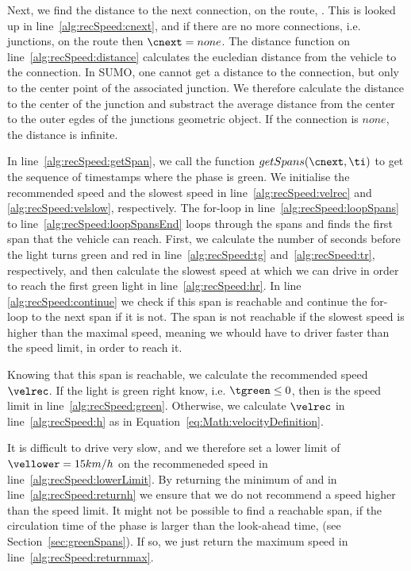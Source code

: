 Next, we find the distance to the next connection, \cnext on the route, \route. 
This is looked up in line~\ref{alg:recSpeed:cnext}, and if there are no more connections, i.e. junctions, on the route then $\cnext=none$.
The distance function on line~\ref{alg:recSpeed:distance} calculates the eucledian distance from the vehicle to the connection.
In SUMO, one cannot get a distance to the connection, but only to the center point of the associated junction.
We therefore calculate the distance to the center of the junction and substract the average distance from the center to the outer egdes of the junctions geometric object. %
If the connection is $none$, the distance is infinite.

In line~\ref{alg:recSpeed:getSpan}, we call the function $getSpans(\cnext, \ti)$ to get the sequence of timestamps where the phase is green.
We initialise the recommended speed and the slowest speed in line~\ref{alg:recSpeed:velrec} and \ref{alg:recSpeed:velslow}, respectively.
The for-loop in line~\ref{alg:recSpeed:loopSpans} to line~\ref{alg:recSpeed:loopSpansEnd} loops through the spans and finds the first span that the vehicle can reach.
First, we calculate the number of seconds before the light turns green and red in line~\ref{alg:recSpeed:tg} and~\ref{alg:recSpeed:tr}, respectively, and then calculate the slowest speed at which we can drive in order to reach the first green light in line~\ref{alg:recSpeed:hr}.
In line \ref{alg:recSpeed:continue} we check if this span is reachable and continue the for-loop to the next span if it is not. 
The span is not reachable if the slowest speed is higher than the maximal speed, meaning we whould have to driver faster than the speed limit, in order to reach it.

Knowing that this span is reachable, we calculate the recommended speed $\velrec$.
If the light is green right know, i.e. $\tgreen \leq 0$, then \velrec is the speed limit in line~\ref{alg:recSpeed:green}. 
Otherwise, we calculate $\velrec$ in line~\ref{alg:recSpeed:h} as in Equation~\ref{eq:Math:velocityDefinition}.

It is difficult to drive very slow, and we therefore set a lower limit of $\vellower=15km/h$ on the recommeneded speed in line~\ref{alg:recSpeed:lowerLimit}. 
By returning the minimum of \velrec and \velmax in line~\ref{alg:recSpeed:returnh} we ensure that we do not recommend a speed higher than the speed limit.
It might not be possible to find a reachable span, if the circulation time of the phase is larger than the look-ahead time, \tmax (see Section~\ref{sec:greenSpans}).
If so, we just return the maximum speed in line~\ref{alg:recSpeed:returnmax}.

